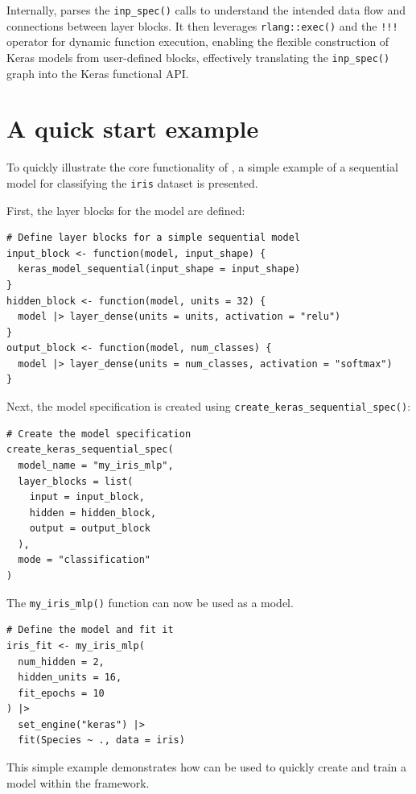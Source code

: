 Internally,  parses the \texttt{inp\_spec()} calls to understand the intended data flow and connections between layer blocks. It then leverages \texttt{rlang::exec()} and the \texttt{!!!} operator for dynamic function execution, enabling the flexible construction of Keras models from user-defined blocks, effectively translating the \texttt{inp\_spec()} graph into the Keras functional API.

\section{A quick start example}\label{a-quick-start-example}

To quickly illustrate the core functionality of , a simple example of a sequential model for classifying the \texttt{iris} dataset is presented.

First, the layer blocks for the model are defined:

\begin{verbatim}
# Define layer blocks for a simple sequential model
input_block <- function(model, input_shape) {
  keras_model_sequential(input_shape = input_shape)
}
hidden_block <- function(model, units = 32) {
  model |> layer_dense(units = units, activation = "relu")
}
output_block <- function(model, num_classes) {
  model |> layer_dense(units = num_classes, activation = "softmax")
}
\end{verbatim}

Next, the  model specification is created using \texttt{create\_keras\_sequential\_spec()}:

\begin{verbatim}
# Create the model specification
create_keras_sequential_spec(
  model_name = "my_iris_mlp",
  layer_blocks = list(
    input = input_block,
    hidden = hidden_block,
    output = output_block
  ),
  mode = "classification"
)
\end{verbatim}

The \texttt{my\_iris\_mlp()} function can now be used as a  model.

\begin{verbatim}
# Define the model and fit it
iris_fit <- my_iris_mlp(
  num_hidden = 2,
  hidden_units = 16,
  fit_epochs = 10
) |>
  set_engine("keras") |>
  fit(Species ~ ., data = iris)
\end{verbatim}

This simple example demonstrates how  can be used to quickly create and train a  model within the  framework.

